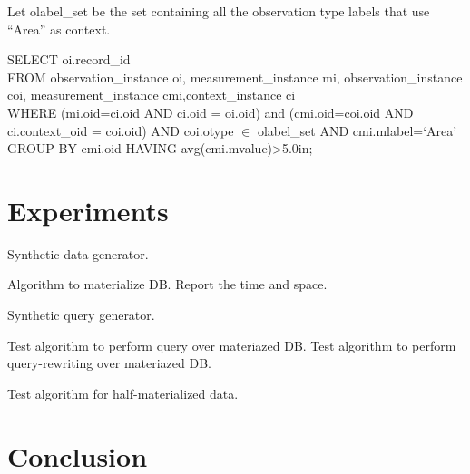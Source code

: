 \documentclass[conference]{IEEEtran}
\begin{document}
Let olabel\_set  be the set containing all the observation type
labels that use ``Area'' as context. 

SELECT oi.record\_id \\
FROM observation\_instance oi, measurement\_instance mi, 
observation\_instance coi, measurement\_instance cmi,context\_instance ci\\
WHERE (mi.oid=ci.oid AND ci.oid = oi.oid) and (cmi.oid=coi.oid AND ci.context\_oid =
coi.oid) AND coi.otype $\in$ olabel\_set 
AND cmi.mlabel=`Area'
GROUP BY cmi.oid
HAVING avg(cmi.mvalue)>5.0in;


\section{Experiments}

Synthetic data generator. 

Algorithm to materialize DB. 
Report the time and space. 

Synthetic query generator. 

Test algorithm to perform query over materiazed DB.
Test algorithm to perform query-rewriting over materiazed DB.

Test algorithm for half-materialized data.

\section{Conclusion}




\end{document}
